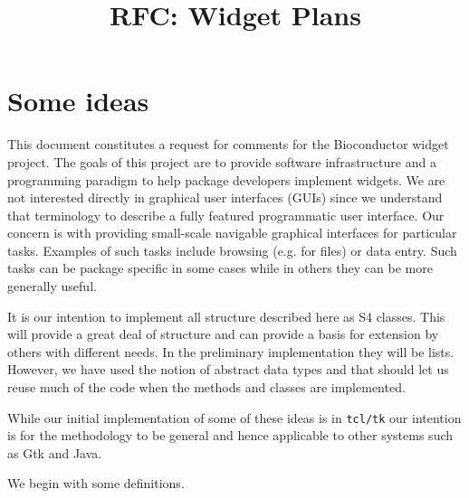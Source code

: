 \documentclass{article}
\begin{document}
\title{RFC: Widget Plans}
\maketitle


\section*{Some ideas}

This document constitutes a request for comments for the Bioconductor
widget project.
The goals of this project are to provide software infrastructure and a
programming paradigm to help package developers implement widgets.
We are not interested directly in graphical user interfaces (GUIs)
since we understand that terminology to describe a fully featured
programmatic user interface. Our concern is with providing small-scale
navigable graphical interfaces for particular tasks. Examples of such
tasks include browsing (e.g. for files) or data entry. Such
tasks can be package specific in some cases while in others they can
be more generally useful.

It is our intention to implement all structure described here as S4
classes. This will provide a great deal of structure and can provide a
basis for extension by others with different needs. In the preliminary
implementation they will be lists. However, we have used the notion of
abstract data types and that should let us reuse much of the
code when the methods and classes are implemented.

While our initial implementation of some of these ideas is in
\verb+tcl/tk+ our intention is for the methodology to be general and
hence applicable to other systems such as Gtk and Java.

We begin with some definitions.
\end{document}
